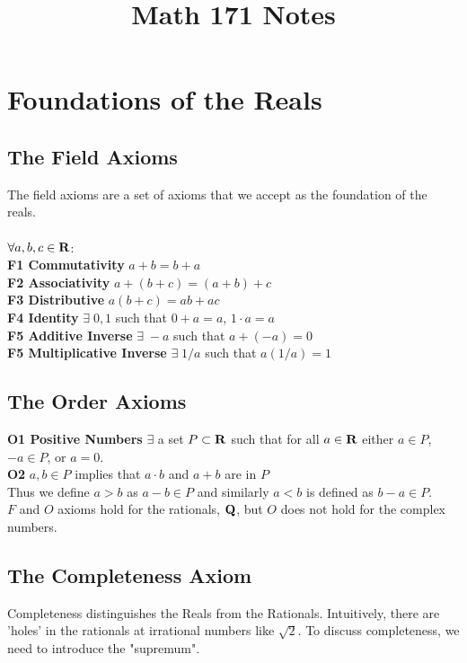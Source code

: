 \documentclass[12pt]{article}
\title{Math 171 Notes}
\begin{document}
\maketitle
\tableofcontents
\newpage
\section{Foundations of the Reals}
  \subsection{The Field Axioms}
    The field axioms are a set of axioms that we accept as the foundation of the reals.\\\\
    $\forall a,b,c \in \mathbf{R}$:\\

    \textbf{F1 Commutativity}   $a+b = b+a$\\
    \textbf{F2 Associativity}  $a+(b +c) = (a+b)+c$\\
    \textbf{F3 Distributive}  $a(b +c) = ab+ac$\\
    \textbf{F4 Identity}  $\exists\;0,1$ such that $0 + a = a$, $1 \cdot a = a$ \\
    \textbf{F5 Additive Inverse}  $\exists\;-a$ such that $a + (-a) = 0$\\
    \textbf{F5 Multiplicative Inverse}  $\exists\;1/a$ such that $a(1/a) = 1$
  \subsection{The Order Axioms}
    \textbf{O1 Positive Numbers} $\exists$ a set $P \subset \mathbf {\mathbf{R}}$ such that for all $a \in \mathbf{R}$ either
    $a \in P$, $-a \in P$, or $a = 0$.\\
    \textbf{O2} $a,b \in P$ implies that $a\cdot b$ and $a + b$ are in $P$\\

    Thus we define $a > b$ as $a - b \in P$ and similarly $a < b$ is defined as $b - a \in P$.\\

    $F$ and $O$ axioms hold for the rationals, $\mathbf{Q}$, but $O$ does not hold for the complex numbers.
  \subsection{The Completeness Axiom}
    Completeness distinguishes the Reals from the Rationals. Intuitively, there are 'holes' in the rationals at
    irrational numbers like $\sqrt{2}$. To discuss completeness, we need to introduce the "supremum".\\
\end{document}

